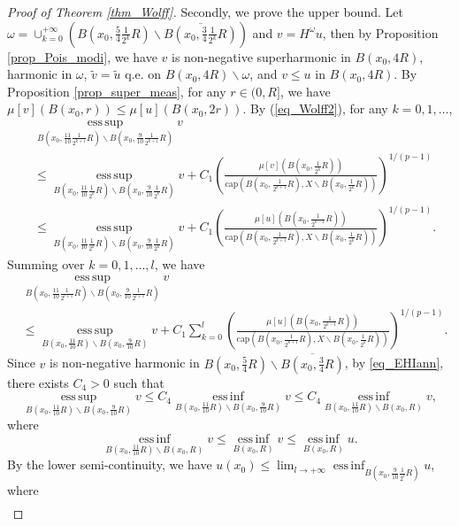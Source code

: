 \documentclass[10pt,a4paper]{amsart}
\newcommand{\einf}{\operatorname*{ess\,inf}}
\newcommand{\esup}{\operatorname*{ess\,sup}}
\begin{document}
\begin{proof}[Proof of Theorem \ref{thm_Wolff}]
Secondly, we prove the upper bound. Let $\omega=\cup_{k=0}^{+\infty}(B(x_0,\frac{5}{4}\frac{1}{2^k}R)\backslash\overline{B(x_0,\frac{3}{4}\frac{1}{2^k}R)})$ and $v=H^\omega u$, then by Proposition \ref{prop_Pois_modi}, we have $v$ is non-negative superharmonic in $B(x_0,4R)$, harmonic in $\omega$, $\widetilde{v}=\widetilde{u}$ q.e. on $B(x_0,4R)\backslash\omega$, and $v\le u$ in $B(x_0,4R)$. By Proposition \ref{prop_super_meas}, for any $r\in(0,{R}]$, we have $\mu[v](B(x_0,r))\le\mu[u](B(x_0,2r))$. By (\ref{eq_Wolff2}), for any $k=0,1,\ldots$,
\begin{align*}
&\esup_{B(x_0,\frac{11}{10}\frac{1}{2^{k+1}}R)\backslash {B(x_0,\frac{9}{10}\frac{1}{2^{k+1}}R)}}v\\
&\le\esup_{B(x_0,\frac{11}{10}\frac{1}{2^{k}}R)\backslash {B(x_0,\frac{9}{10}\frac{1}{2^{k}}R)}}v+C_1 \left(\frac{\mu[v](B(x_0,\frac{1}{2^k}R))}{\mathrm{cap}\left(B(x_0,\frac{1}{2^{k+1}}R),X\backslash B(x_0,\frac{1}{2^k}R)\right)}\right)^{1/(p-1)}\\
&\le\esup_{B(x_0,\frac{11}{10}\frac{1}{2^{k}}R)\backslash {B(x_0,\frac{9}{10}\frac{1}{2^{k}}R)}}v+C_1 \left(\frac{\mu[u](B(x_0,\frac{1}{2^{k-1}}R))}{\mathrm{cap}\left(B(x_0,\frac{1}{2^{k+1}}R),X\backslash B(x_0,\frac{1}{2^k}R)\right)}\right)^{1/(p-1)}.
\end{align*}
Summing over $k=0,1,\ldots,l$, we have
\begin{align*}
&\esup_{B(x_0,\frac{11}{10}\frac{1}{2^{l+1}}R)\backslash {B(x_0,\frac{9}{10}\frac{1}{2^{l+1}}R)}}v\\
&\le\esup_{B(x_0,\frac{11}{10}R)\backslash {B(x_0,\frac{9}{10}R)}}v+C_1\sum_{k=0}^l\left(\frac{\mu[u](B(x_0,\frac{1}{2^{k-1}}R))}{\mathrm{cap}\left(B(x_0,\frac{1}{2^{k+1}}R),X\backslash B(x_0,\frac{1}{2^k}R)\right)}\right)^{1/(p-1)}.
\end{align*}
Since $v$ is non-negative harmonic in $B(x_0,\frac{5}{4}R)\backslash \overline{B(x_0,\frac{3}{4}R)}$, by \ref{eq_EHIann}, there exists $C_4>0$ such that
\begin{equation*}
\esup_{B(x_0,\frac{11}{10}R)\backslash {B(x_0,\frac{9}{10}R)}}v\le C_4\einf_{B(x_0,\frac{11}{10}R)\backslash {B(x_0,\frac{9}{10}R)}}v\le C_4\einf_{B(x_0,\frac{11}{10}R)\backslash {B(x_0,R)}}v,
\end{equation*}
where
$$\einf_{B(x_0,\frac{11}{10}R)\backslash {B(x_0,R)}}v\le\einf_{B(x_0,R)}v\le\einf_{B(x_0,R)}u.$$
By the lower semi-continuity, we have $u(x_0)\le\lim_{l\to+\infty}\einf_{B(x_0,\frac{9}{10}\frac{1}{2^{l}}R)}u$, where
\begin{align*}

\end{align*}
\end{proof}
\end{document}
